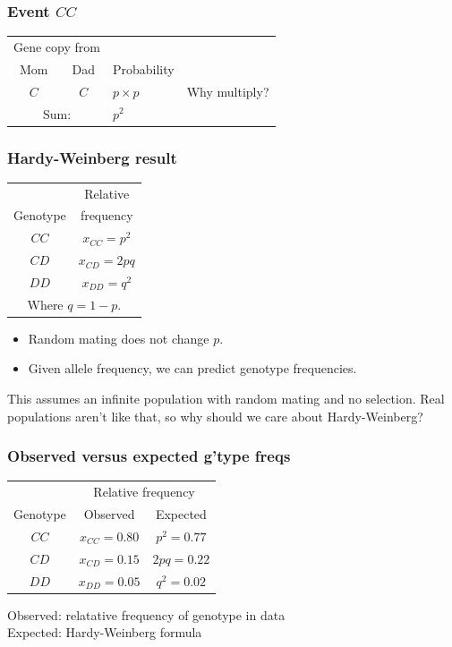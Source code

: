 \documentclass[12pt]{beamer}
\begin{document}
\begin{frame}
\frametitle{Event $CC$}
\begin{center}
\begin{tabular}{ccll}
\multicolumn{2}{c}{Gene copy from}\\ \cline{1-2}
Mom  & Dad & Probability\\
\cline{1-3}
$C$  & $C$ & $p \times p$ & Why multiply?\\
\cline{1-3}
\multicolumn{2}{c}{Sum:} & $p^2$
\end{tabular}
\end{center}
\end{frame}

\begin{frame}
\frametitle{Hardy-Weinberg result}
\begin{center}
\begin{tabular}{cc}
  & Relative\\
Genotype & frequency\\ \hline
$CC$ & $x_{CC} = p^2$\\
$CD$ & $x_{CD} = 2pq$\\
$DD$ & $x_{DD} = q^2$\\\hline
\multicolumn{2}{c}{\rule{0pt}{2.5ex}Where $q=1-p$.}
\end{tabular}
\end{center}
\begin{itemize}
\item Random mating does not change $p$.
\item Given allele frequency, we can predict genotype frequencies.
\end{itemize}
\pause This assumes an infinite population with random mating and no
selection. Real populations aren't like that, so why should we care
about Hardy-Weinberg?
\end{frame}

\begin{frame}
\frametitle{Observed versus expected g'type freqs}
\begin{center}
  \begin{tabular}{ccc}
        & \multicolumn{2}{c}{Relative frequency}\\ \cline{2-3}
Genotype& Observed & Expected\\ \hline
$CC$ &$x_{CC} = 0.80$ & $p^2 = 0.77$\\
$CD$ &$x_{CD} = 0.15$ & $2pq = 0.22$\\
$DD$ &$x_{DD} = 0.05$ & $q^2=0.02$\\ \hline
\end{tabular}
\end{center}
Observed: relatative frequency of genotype in data\\
Expected: Hardy-Weinberg formula
\end{frame}
\end{document}
